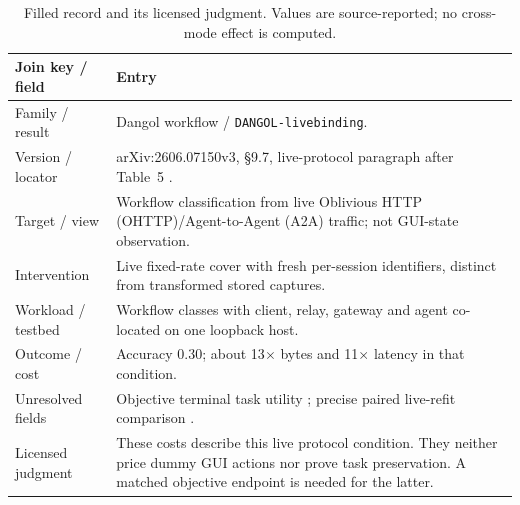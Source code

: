 \begin{table}[t]\centering\footnotesize
\caption{Filled record and its licensed judgment. Values are source-reported; no cross-mode effect is computed.}\label{tab:result-lineage}
\begin{tabularx}{\columnwidth}{@{}p{}Y@{}}\toprule
Join key / field & Entry\\\midrule
Family / result & Dangol workflow / \texttt{DANGOL-livebinding}.\\
Version / locator & arXiv:2606.07150v3, \S9.7, live-protocol paragraph after Table~5 \cite{dangol2026workflow}.\\
Target / view & Workflow classification from live Oblivious HTTP (OHTTP)/Agent-to-Agent (A2A) traffic; not GUI-state observation.\\
Intervention & Live fixed-rate cover with fresh per-session identifiers, distinct from transformed stored captures.\\
Workload / testbed & Workflow classes with client, relay, gateway and agent co-located on one loopback host.\\
Outcome / cost & Accuracy 0.30; about 13$\times$ bytes and 11$\times$ latency in that condition.\\
Unresolved fields & Objective terminal task utility \NRR{}; precise paired live-refit comparison \NRV{}.\\
Licensed judgment & These costs describe this live protocol condition. They neither price dummy GUI actions nor prove task preservation. A matched objective endpoint is needed for the latter.\\\bottomrule
\end{tabularx}\end{table}
